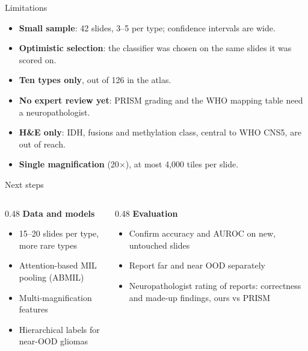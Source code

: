 \documentclass[aspectratio=169,11pt]{beamer}
\begin{document}
\begin{frame}{Limitations}
  \begin{itemize}
    \item \textbf{Small sample}: 42 slides, 3--5 per type; confidence intervals are wide.
    \item \textbf{Optimistic selection}: the classifier was chosen on the same slides it was scored on.
    \item \textbf{Ten types only}, out of 126 in the atlas.
    \item \textbf{No expert review yet}: PRISM grading and the WHO mapping table need a neuropathologist.
    \item \textbf{H\&E only}: IDH, fusions and methylation class, central to WHO CNS5, are out of reach.
    \item \textbf{Single magnification} (20$\times$), at most 4{,}000 tiles per slide.
  \end{itemize}
\end{frame}

\begin{frame}{Next steps}
  \begin{columns}[T]
    \begin{column}{0.48\textwidth}
      \textbf{Data and models}
      \begin{itemize}
        \item 15--20 slides per type, more rare types
        \item Attention-based MIL pooling (ABMIL)
        \item Multi-magnification features
        \item Hierarchical labels for near-OOD gliomas
      \end{itemize}
    \end{column}
    \begin{column}{0.48\textwidth}
      \textbf{Evaluation}
      \begin{itemize}
        \item Confirm accuracy and AUROC on new, untouched slides
        \item Report far and near OOD separately
        \item Neuropathologist rating of reports: correctness and made-up findings, ours vs PRISM
      \end{itemize}
    \end{column}
  \end{columns}
\end{frame}
\end{document}
